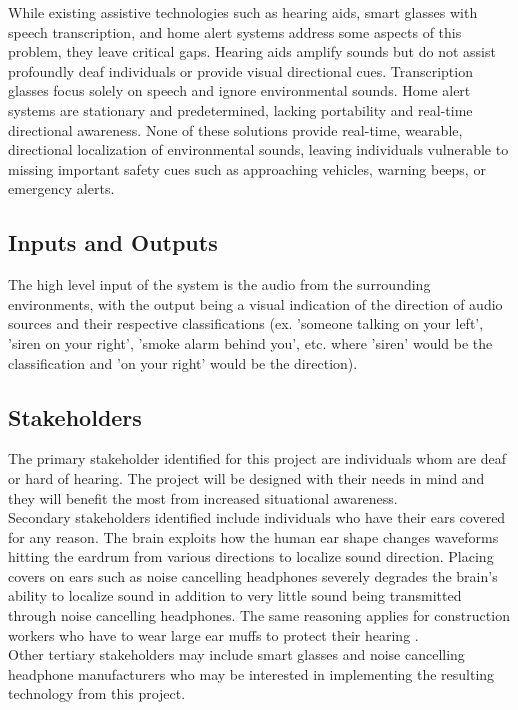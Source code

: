 \documentclass{article}
\begin{document}
While existing assistive technologies such as hearing aids, smart glasses with
speech transcription, and home alert systems address some aspects of this
problem, they leave critical gaps. Hearing aids amplify sounds but do not assist
profoundly deaf individuals or provide visual directional cues. Transcription
glasses focus solely on speech and ignore environmental sounds. Home alert
systems are stationary and predetermined, lacking portability and real-time
directional awareness. None of these solutions provide real-time, wearable,
directional localization of environmental sounds, leaving individuals vulnerable
to missing important safety cues such as approaching vehicles, warning beeps, or
emergency alerts.


\subsection{Inputs and Outputs}

The high level input of the system is the audio from the surrounding
environments, with the output being a visual indication of the direction of
audio sources and their respective classifications (ex. 'someone talking
on your left', 'siren on your right', 'smoke alarm behind you', etc. 
where 'siren' would be the classification and 'on your right' would be the 
direction).

\subsection{Stakeholders}

The primary stakeholder identified for this project are individuals whom are
deaf or hard of hearing. The project will be designed with their needs in mind
and they will benefit the most from increased situational awareness. 
\\[\baselineskip]
Secondary stakeholders identified include individuals who have their ears 
covered for any reason. The brain exploits how the human 
ear shape changes waveforms hitting the eardrum from various directions to 
localize sound direction. Placing covers on ears such as noise cancelling 
headphones severely degrades 
the brain's ability to localize sound in addition to very little sound being 
transmitted through noise cancelling headphones. The same reasoning applies for 
construction workers who have to wear large ear muffs to protect their hearing 
\cite{HIL_HearingCues}. 
\\[\baselineskip]
Other tertiary stakeholders may include smart glasses and noise cancelling 
headphone manufacturers who may be interested in implementing the resulting 
technology from this project. 
\end{document}
